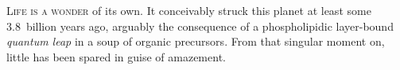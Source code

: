 
\textsc{Life is a wonder} of its own.  It conceivably struck this planet at
least some 3.8~billion years ago,\cite{mojzsis_evidence_1996} arguably the
consequence of a phospholipidic \mbox{layer-bound} \emph{quantum leap} in a soup
of organic precursors.\cite{miller_organic_1959} From that singular moment on,
little has been spared in guise of amazement.

\bigskip





